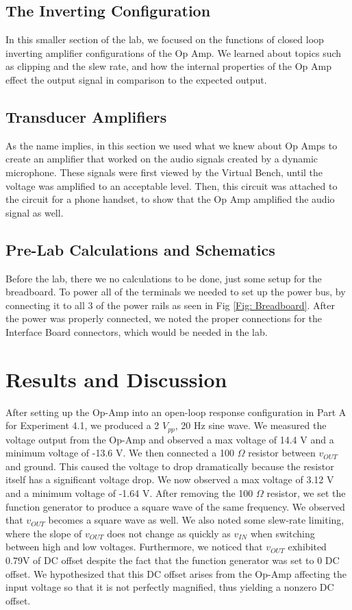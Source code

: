 \documentclass[10pt]{article}
\begin{document}
\subsection{The Inverting Configuration}
In this smaller section of the lab, we focused on the functions of closed loop inverting amplifier configurations of the Op Amp. We learned about topics such as clipping and the slew rate, and how the internal properties of the Op Amp effect the output signal in comparison to the expected output.
\subsection{Transducer Amplifiers}
As the name implies, in this section we used what we knew about Op Amps to create an amplifier that worked on the audio signals created by a dynamic microphone. These signals were first viewed by the Virtual Bench, until the voltage was amplified to an acceptable level. Then, this circuit was attached to the circuit for a phone handset, to show that the Op Amp amplified the audio signal as well. 

\subsection{Pre-Lab Calculations and Schematics}

Before the lab, there we no calculations to be done, just some setup for the breadboard. To power all of the terminals we needed to set up the power bus, by connecting it to all 3 of the power rails as seen in Fig \ref{Fig: Breadboard}. After the power was properly connected, we noted the proper connections for the Interface Board connectors, which would be needed in the lab.

\section{Results and Discussion}

\qquad After setting up the Op-Amp into an open-loop response configuration in Part A for Experiment 4.1, we produced a 2 $V_{pp}$, 20 Hz sine wave. We measured the voltage output from the Op-Amp and observed a max voltage of 14.4 V and a minimum voltage of -13.6 V. We then connected a 100 $\Omega$ resistor between $v_{OUT}$ and ground. This caused the voltage to drop dramatically because the resistor itself has a significant voltage drop. We now observed a max voltage of 3.12 V and a minimum voltage of -1.64 V. After removing the 100 $\Omega$ resistor, we set the function generator to produce a square wave of the same frequency. We observed that $v_{OUT}$ becomes a square wave as well. We also noted some slew-rate limiting, where the slope of $v_{OUT}$ does not change as quickly as $v_{IN}$ when switching between high and low voltages. Furthermore, we noticed that $v_{OUT}$ exhibited 0.79V of DC offset despite the fact that the function generator was set to 0 DC offset. We hypothesized that this DC offset arises from the Op-Amp affecting the input voltage so that it is not perfectly magnified, thus yielding a nonzero DC offset. 
\end{document}

